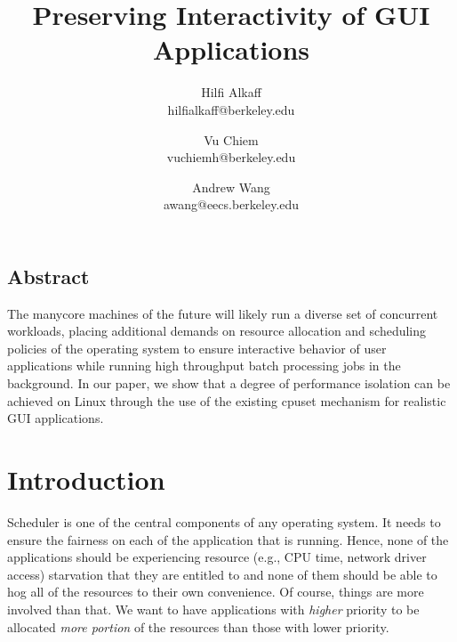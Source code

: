 \documentclass[letterpaper,twocolumn,11pt]{article}
\begin{document}
\date{}

\title{\Large \bf Preserving Interactivity of GUI Applications}

\author{
{\rm Hilfi Alkaff}\\
hilfialkaff@berkeley.edu
\and
{\rm Vu Chiem}\\
vuchiemh@berkeley.edu
\and
{\rm Andrew Wang}\\
awang@eecs.berkeley.edu
} %

\maketitle

\thispagestyle{empty}


\subsection*{Abstract}
The manycore machines of the future will likely run a diverse set of concurrent workloads, placing additional demands on resource allocation and scheduling policies of the operating system to ensure interactive behavior of user applications while running high throughput batch processing jobs in the background. In our paper, we show that a degree of performance isolation can be achieved on Linux through the use of the existing cpuset mechanism for realistic GUI applications.

\section{Introduction}

Scheduler is one of the central components of any operating system. It needs to ensure the fairness on each of the application that is running. Hence, none of the applications should be experiencing resource (e.g., CPU time, network driver access) starvation that they are entitled to and none of them should be able to hog all of the resources to their own convenience. Of course, things are more involved than that. We want to have applications with \emph{higher} priority to be allocated \emph{more portion} of the resources than those with lower priority.
\end{document}
